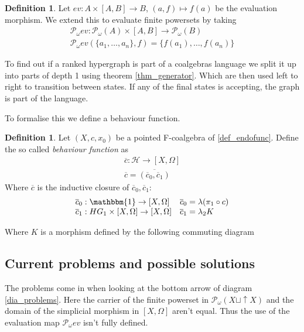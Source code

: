 \documentclass[12pt]{article}
\theoremstyle{definition}
\newtheorem{definition}[theorem]{Definition}
\newcommand{\1}{\mathbbm{1}}
\newcommand{\id}{\text{id}}
\renewcommand{\H}{\mathcal{H}}
\newcommand{\finP}{\mathcal{P}_{\omega}}
\newcommand{\beh}{\overline{c}}
\begin{document}
\begin{definition}
    Let $ev: A\times [A,B] \to B$, $(a, f)\mapsto f(a)$ be the evaluation morphism. We extend this to evaluate finite powersets by taking
    \begin{align*}
        \finP ev: \finP(A)\times [A,B] \to \finP(B)\\
        \finP ev(\{a_1, \dots, a_n\}, f) = \{f(a_1), \dots, f(a_n)\}
    \end{align*}
\end{definition}

To find out if a ranked hypergraph is part of a coalgebras language we split it up into parts of depth 1 using theorem \ref{thm_generator}. Which are then used left to right to transition between states. If any of the final states is accepting, the graph is part of the language.

To formalise this we define a behaviour function.

\begin{definition}
    Let $(X, c, x_0)$ be a pointed F-coalgebra of \ref{def_endofunc}. Define the so called \emph{behaviour function} as
    \begin{align*}
        \beh : \H \to [X, \Omega] \\
        \beh = \overline{(\beh_0, \beh_1)}
    \end{align*}
    Where $\beh$ is the inductive closure of $\beh_0, \beh_1$:\\
    \[
        \begin{array}{ll}
            \beh_0: \1 \to [X, \Omega] & \beh_0 = \lambda(\pi_1\circ c)\\
            \beh_1: HG_1\times [X, \Omega] \to [X, \Omega] & \beh_1 = \lambda_2 K
        \end{array}
    \]

    Where $K$ is a morphism defined by the following commuting diagram
    \begin{center}\label{dia_problems}
    \end{center}
\end{definition}
\subsection{Current problems and possible solutions}\label{sec:coalg_problems} The problems come in when looking at the bottom arrow of diagram \ref{dia_problems}. Here the carrier of the finite powerset in $\finP(X\sqcup \uparrow X)$ and the domain of the simplicial morphism in $[X,\Omega]$ aren't equal. Thus the use of the evaluation map $\finP ev$ isn't fully defined.
\end{document}
